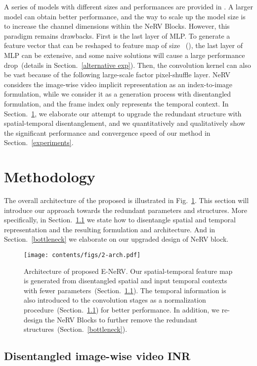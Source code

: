 \documentclass[runningheads]{llncs}
\begin{document}
A series of models with different sizes and performances are provided in \cite{chen2021nerv}. A larger model can obtain better performance, and the way to scale up the model size is to increase the channel dimensions within the NeRV Blocks.
However, this paradigm remains drawbacks. First is the last layer of MLP. To generate a feature vector that can be reshaped to feature map of size ~(), the last layer of MLP can be extensive, and some naive solutions will cause a large performance drop~(details in Section.~\ref{alternative exp}). Then, the convolution kernel can also be vast because of the following large-scale factor pixel-shuffle layer. NeRV considers the image-wise video implicit representation as an index-to-image formulation, while we consider it as a generation process with disentangled formulation, and the frame index only represents the temporal context. In Section.~\ref{method}, we elaborate our attempt to upgrade the redundant structure with spatial-temporal disentanglement, and we quantitatively and qualitatively show the significant performance and convergence speed of our method in Section.~\ref{experiments}. \section{Methodology}
\label{method}

The overall architecture of the proposed \netname is illustrated in Fig.~\ref{fig:arch}. This section will introduce our approach towards the redundant parameters and structures. More specifically, in Section.~\ref{frame condition} we state how to disentangle spatial and temporal representation and the resulting formulation and architecture. And in Section.~\ref{bottleneck} we elaborate on our upgraded design of NeRV block. 


\begin{figure}[t]
    \centering
    \texttt{[image: contents/figs/2-arch.pdf]}
    \caption{Architecture of proposed E-NeRV. Our spatial-temporal feature map  is generated from disentangled spatial and input temporal contexts with fewer parameters~(Section.~\ref{frame condition}). The temporal information is also introduced to the convolution stages as a normalization procedure~(Section.~\ref{frame condition}) for better performance. In addition, we re-design the NeRV Blocks to further remove the redundant structures~(Section.~\ref{bottleneck}).}
    \label{fig:arch}
\end{figure}

\subsection{Disentangled image-wise video INR}
\label{frame condition}
\end{document}
